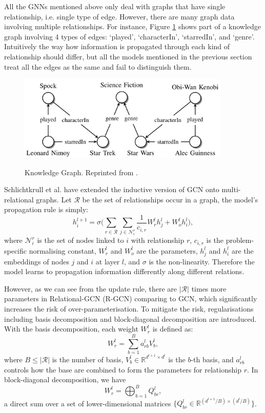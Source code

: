 \documentclass[12pt]{report}
\begin{document}
All the GNNs mentioned above only deal with graphs that have single relationship, i.e. single type of edge. However, there are many graph data involving multiple relationships. For instance, Figure \ref{kg} shows part of a knowledge graph involving 4 types of edges: `played', `characterIn', `starredIn', and `genre'. Intuitively the way how information is propagated through each kind of relationship should differ, but all the models mentioned in the previous section treat all the edges as the same and fail to distinguish them.
\begin{figure}[H]
\centering
\includegraphics[width=0.9\textwidth]{figures/kg.png}
\label{kg}
\caption[Knowledge Graph]{Knowledge Graph. Reprinted from \cite{nickel_review_2016}.}
\end{figure}
Schlichtkrull et al. \cite{schlichtkrull_modeling_2018} have extended the inductive version of
GCN onto multi-relational graphs. Let $\mathcal{R}$ be the set of relationships occur in a graph, the model's propagation rule is simply:
\[h_i^{l+1} = \sigma\bigg(\sum_{r\in\mathcal{R}}\sum_{j\in\mathcal{N}_i^r} \frac{1}{c_{i,r}}W_r^l h_j^l +W_o^l h_i^l \bigg),\]
where $\mathcal{N}_i^r$ is the set of nodes linked to $i$ with relationship $r$, $c_{i,r}$ is the problem-specific normalising constant, $W_r^l$ and $W_o^l$ are the parameters, $h_j^l$ and $h_i^l$ are the embeddings of nodes $j$ and $i$ at layer $l$, and $\sigma$ is the non-linearity. Therefore the model learns to propagation information differently along different relations.

However, as we can see from the update rule, there are  $|\mathcal{R}|$ times more parameters in Relational-GCN (R-GCN) comparing to GCN, which significantly increases the risk of over-parameterisation. To mitigate the risk, regularisations including
basis decomposition and block-diagonal decomposition are introduced. With the basis decomposition, each weight $W_r^l$ is defined as:
\[W_r^l = \sum_{b=1}^B a_{rb}^l V_b^l,\]
where $B \leq |\mathcal{R}|$ is the number of basis, $V_b^l \in \mathbb{R}^{d^{l+1}\times d^l}$ is the $b$-th basis, and $a_{rb}^l$ controls how the base are combined to form the parameters for relationship $r$. In block-diagonal decomposition, we have
\[W_r^l = \bigoplus^{B}_{b=1}Q_{br}^l,\]
a direct sum over a set of lower-dimensional matrices $\{Q_{br}^l \in \mathbb{R}^{(d^{l+1}/B)\times(d^l/B)}\}$.
\end{document}
